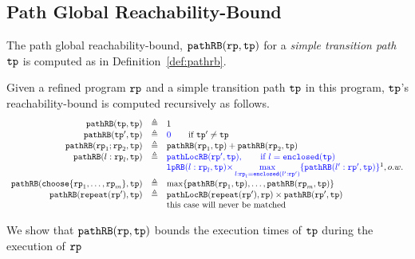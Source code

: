 \subsection{Path Global Reachability-Bound}
\label{sec:pathrb}
The path global reachability-bound, $\mathtt{pathRB}(\mathtt{rp}, \mathtt{tp})$ for a \emph{simple transition path} $\mathtt{tp}$ is computed as in Definition~\ref{def:pathrb}.
%
\begin{defn}
  \label{def:pathrb}
  Given a refined program $\mathtt{rp}$ and a simple transition path $\mathtt{tp}$ in this program, 
  $\mathtt{tp}$'s reachability-bound
  is computed recursively as follows. 
\[
  \begin{array}{rcl}
    \inoutB(\tpath, \tpath) & \triangleq & 1  \\
    \inoutB(\tpath', \tpath) & \triangleq & \highlight{0} \qquad \text{if } \tpath' \neq \tpath\\
    \inoutB(\rprog_1;\rprog_2, \tpath) & \triangleq & \inoutB(\rprog_1, \tpath) + \inoutB(\rprog_2, \tpath) \\
    \inoutB(l: \rprog_l, \tpath) & \triangleq & 
    \highlight{\outinB(\rprog', \tpath), \qquad \text{if } l = \kw{enclosed}(\tpath)}
    \\
    &  & 
    \highlight{
      \lpchB(l:\rprog_l, \tpath ) }
    \highlight{\times \max\limits_{l:\rprog_l = \kw{enclosed}(l':\rprog')}
   \{\inoutB(l':\rprog', \tpath)\} } \footnotemark, o.w. \\
    \inoutB(\rpchoose{\rprog_1, \ldots, \rprog_m }, \tpath) & \triangleq 
    & \max\left\{ \inoutB(\rprog_1, \tpath), \ldots, \inoutB(\rprog_m, \tpath) \right\} 
    \\
    \inoutB(\rprepeat(\rprog'), \tpath) & \triangleq & \outinB(\rprepeat(\rprog'), \rprog) \times \inoutB(\rprog', \tpath)\\
    &  & \text{this case will never be matched}
    \end{array}
  \]
  \end{defn}
%
We show that $\mathtt{pathRB}(\mathtt{rp}, \mathtt{tp})$ bounds the execution times of $\mathtt{tp}$ during the execution of $\mathtt{rp}$

